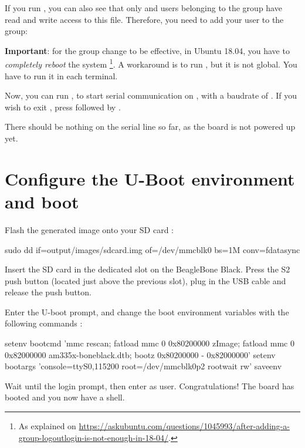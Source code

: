 If you run , you can also see that only
 and users belonging to the  group have
read and write access to this file. Therefore, you need to add your user
to the  group:


{\bf Important}: for the group change to be effective, in Ubuntu 18.04, you have to
{\em completely reboot} the system \footnote{As explained on
\url{https://askubuntu.com/questions/1045993/after-adding-a-group-logoutlogin-is-not-enough-in-18-04/}.}.
A workaround is to run , but it is not global.
You have to run it in each terminal.

Now, you can run , to start serial
communication on , with a baudrate of . If
you wish to exit , press \code{[Ctrl][a]} followed by
\code{[Ctrl][x]}.

There should be nothing on the serial line so far, as the board is not
powered up yet.

\section{Configure the U-Boot environment and boot}

Flash the generated image onto your SD card :

\begin{bashinput}
	sudo dd if=output/images/sdcard.img of=/dev/mmcblk0 bs=1M conv=fdatasync
\end{bashinput}


Insert the SD card in the dedicated slot on the BeagleBone Black. Press the S2
push button (located just above the previous slot), plug in the USB cable and
release the push button.

Enter the U-boot prompt, and change the boot environment variables with the following commands :

\begin{bashinput}
setenv bootcmd 'mmc rescan; fatload mmc 0 0x80200000 zImage; fatload mmc 0 0x82000000 am335x-boneblack.dtb; bootz 0x80200000 - 0x82000000'
setenv bootargs 'console=ttyS0,115200 root=/dev/mmcblk0p2 rootwait rw'
saveenv
\end{bashinput}

Wait until the login prompt, then enter  as user.
Congratulations! The board has booted and you now have a shell.

